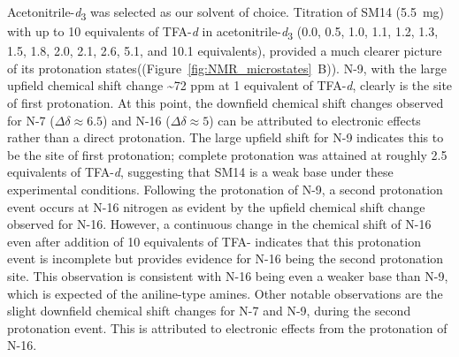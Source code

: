\documentclass[9pt,lineno]{elife}
\begin{document}
Acetonitrile-\textit{d}\textsubscript{3} was selected as our solvent of choice. Titration of SM14 (5.5~mg) with up to 10 equivalents of TFA-\textit{d} in acetonitrile-\textit{d}\textsubscript{3} (0.0, 0.5, 1.0, 1.1, 1.2, 1.3, 1.5, 1.8, 2.0, 2.1, 2.6, 5.1, and 10.1 equivalents), provided a much clearer picture of its protonation states((Figure~\ref{fig:NMR_microstates}~B)). N-9, with the large upfield chemical shift change \textasciitilde72 ppm at 1 equivalent of TFA-\textit{d}, clearly is the site of first protonation. At this point, the downfield chemical shift changes observed for N-7 ($\Delta\delta \approx 6.5$) and N-16 ($\Delta\delta \approx 5$) can be attributed to electronic effects rather than a direct protonation. The large upfield shift for N-9 indicates this to be the site of first protonation; complete protonation was attained at roughly 2.5 equivalents of TFA-\textit{d}, suggesting that SM14 is a weak base under these experimental conditions. Following the protonation of N-9, a second protonation event occurs at N-16 nitrogen as evident by the upfield chemical shift change observed for N-16. However, a continuous change in the chemical shift of N-16 even after addition of 10 equivalents of TFA- indicates that this protonation event is incomplete but provides evidence for N-16 being the second protonation site. This observation is consistent with N-16 being even a weaker base than N-9, which is expected of the aniline-type amines. Other notable observations are the slight downfield chemical shift changes for N-7 and N-9, during the second protonation event. This is attributed to electronic effects from the protonation of N-16.
\end{document}
